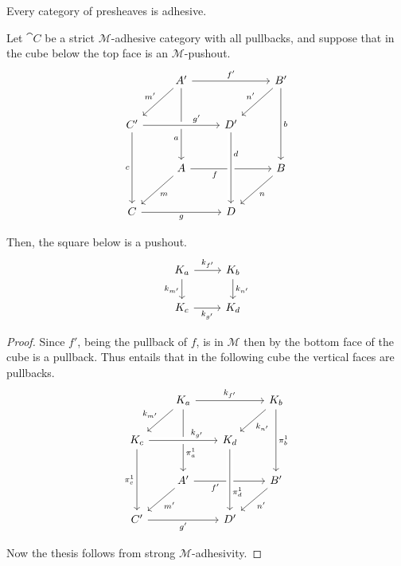 \begin{cor}\label{cor:presh_adhesive}
    Every category of presheaves is adhesive.
\end{cor}



\begin{lemma}\label{lemma:pushouts_kernel_pairs}
	Let $\cat C$ be a strict $\mathcal{M}$-adhesive category with all pullbacks, and suppose that in the cube below the top face is an $\mathcal{M}$-pushout.
	\[\begin{tikzcd}[row sep=25, column sep=25]
		& {A'} && {B'} \\
		{C'} && {D'} \\
		& A && B \\
		C && D
		\arrow["{f'}", from=1-2, to=1-4]
		\arrow["{m'}"', from=1-2, to=2-1]
		\arrow["a"'{pos=0.7}, from=1-2, to=3-2]
		\arrow["{n'}"', from=1-4, to=2-3]
		\arrow["b", from=1-4, to=3-4]
		\arrow["{g'}"{pos=0.7}, from=2-1, to=2-3, crossing over]
		\arrow["c"', from=2-1, to=4-1]
		\arrow["f"'{pos=0.3}, from=3-2, to=3-4]
		\arrow["d"{pos=0.3}, from=2-3, to=4-3, crossing over]
		\arrow["m", from=3-2, to=4-1]
		\arrow["n", from=3-4, to=4-3]
		\arrow["g"', from=4-1, to=4-3]
	\end{tikzcd}\]
	
	Then, the square below is a pushout.
	\[
	\begin{tikzcd}%
		{K_a} \ar[r, "{k_{f'}}"] \ar[d, "{k_{m'}}"'] & {K_b} \ar[d, "{k_{n'}}"] \\
		{K_c} \ar[r, "{k_{g'}}"'] & {K_d}
	\end{tikzcd}
	\]
\end{lemma}

\begin{proof}
	Since $f'$, being the pullback of $f$, is in $\mathcal{M}$ then by   the bottom face of the cube is a pullback. Thus  entails that in the following cube the vertical faces are pullbacks.
	\[\begin{tikzcd}[row sep = 20, column sep = 20]
		& {K_a} && {K_b} \\
		{K_c} && {K_d} \\
		& {A'} && {B'} \\
		{C'} && {D'}
		\arrow["{k_{f'}}", from=1-2, to=1-4]
		\arrow["{k_{m'}}"', from=1-2, to=2-1]
		\arrow["{\pi_a^1}"{pos=0.7}, from=1-2, to=3-2]
		\arrow["{k_{n'}}", from=1-4, to=2-3]
		\arrow["{\pi_b^1}", from=1-4, to=3-4]
		\arrow["{k_{g'}}"{pos=0.7}, from=2-1, to=2-3, crossing over]
		\arrow["{\pi_c^1}"', from=2-1, to=4-1]
		\arrow["{f'}"'{pos=0.3}, from=3-2, to=3-4]
		\arrow["{\pi_d^1}"{pos=0.7}, from=2-3, to=4-3, crossing over]
		\arrow["{m'}", from=3-2, to=4-1]
		\arrow["{n'}", from=3-4, to=4-3]
		\arrow["{g'}"', from=4-1, to=4-3]
	\end{tikzcd}\]
	
Now the thesis follows from strong $\mathcal{M}$-adhesivity.
\end{proof}



